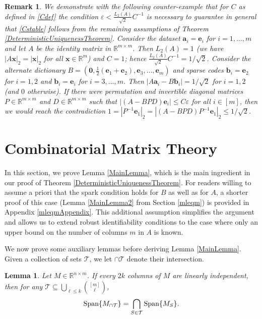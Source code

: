 \documentclass[journal, twocolumn]{IEEEtran}
\newtheorem{lemma}{Lemma}
\newtheorem{remark}{Remark}
\begin{document}
\begin{remark}
We demonstrate with the following counter-example that for $C$ as defined in \eqref{Cdef} the condition $\varepsilon < \frac{L_2(A)}{\sqrt{2}}C^{-1}$ is necessary to guarantee in general that \eqref{Cstable} follows from the remaining assumptions of Theorem \ref{DeterministicUniquenessTheorem}. Consider the dataset $\mathbf{a}_i = \mathbf{e}_i$ for $i = 1, \ldots, m$ and let $A$ be the identity matrix in $\mathbb{R}^{m \times m}$. Then $L_2(A) = 1$ (we have $|A\mathbf{x}|_2 = |\mathbf{x}|_2$ for all $\mathbf{x} \in \mathbb{R}^m$) and $C = 1$; hence $\frac{L_2(A)}{\sqrt{2}}C^{-1} = 1/\sqrt{2}$. Consider the alternate dictionary $B = \left(\mathbf{0}, \frac{1}{2}(\mathbf{e}_1 + \mathbf{e}_2), \mathbf{e}_3, \ldots, \mathbf{e}_{m} \right)$ and sparse codes $\mathbf{b}_i = \mathbf{e}_2$ for $i = 1, 2$ and $\mathbf{b}_i = \mathbf{e}_i$ for $i = 3, \ldots, m$. Then $|A\mathbf{a}_i - B\mathbf{b}_i| = 1/\sqrt{2}$ for $i = 1, 2$ (and $0$ otherwise). If there were permutation and invertible diagonal matrices $P \in \mathbb{R}^{m \times m}$ and $D \in \mathbb{R}^{m \times m}$ such that $|(A-BPD)\mathbf{e}_i| \leq C\varepsilon$ for all $i \in [m]$, then we would reach the contradiction $1 = |P^{-1}\mathbf{e}_1|_2 = |(A-BPD)P^{-1}\mathbf{e}_1|_2 \leq 1/\sqrt{2}$. 
\end{remark}




\appendices
\section{Combinatorial Matrix Theory}\label{appendixA}

In this section, we prove Lemma \ref{MainLemma}, which is the main ingredient in our proof of Theorem \ref{DeterministicUniquenessTheorem}. For readers willing to assume a priori that the spark condition holds for $B$ as well as for $A$, a shorter proof of this case (Lemma \ref{MainLemma2} from Section \ref{mleqm}) is provided in Appendix \ref{mleqmAppendix}. This additional assumption simplifies the argument and allows us to extend robust identifiability conditions to the case where only an upper bound on the number of columns $m$ in $A$ is known. 

We now prove some auxiliary lemmas before deriving Lemma \ref{MainLemma}.  Given a collection of sets $\mathcal{T}$, we let $\cap \mathcal{T}$ denote their intersection.

\begin{lemma}\label{SpanIntersectionLemma}
Let $M \in \mathbb{R}^{n \times m}$. If every $2k$ columns of $M$ are linearly independent, then for any $\mathcal{T} \subseteq \bigcup_{\ell \leq k} {[m] \choose \ell}$,
\begin{align}
\text{\rm Span}\{M_{\cap \mathcal{T}}\}  = \bigcap_{S \in \mathcal{T}} \text{\rm Span}\{M_S\}.
\end{align}
\end{lemma}
\end{document}
